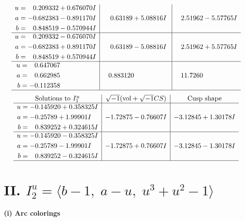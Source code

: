 \documentclass[1p]{elsarticle_modified}
\theoremstyle{definition}
\newcommand{\I}{\sqrt{-1}}
\begin{document}
$$\begin{array}{c|c|c}
\begin{aligned}
u &= \phantom{-}0.209332 + 0.676070 I \\
a &= -0.682383 - 0.891170 I \\
b &= \phantom{-}0.848519 - 0.570944 I\end{aligned}
 & \phantom{-}0.63189 + 5.08816 I & \phantom{-}2.51962 - 5.57765 I \\ \hline\begin{aligned}
u &= \phantom{-}0.209332 - 0.676070 I \\
a &= -0.682383 + 0.891170 I \\
b &= \phantom{-}0.848519 + 0.570944 I\end{aligned}
 & \phantom{-}0.63189 - 5.08816 I & \phantom{-}2.51962 + 5.57765 I \\ \hline\begin{aligned}
u &= \phantom{-}0.647067\phantom{ +0.000000I} \\
a &= \phantom{-}0.662985\phantom{ +0.000000I} \\
b &= -0.112358\phantom{ +0.000000I}\end{aligned}
 & \phantom{-}0.883120\phantom{ +0.000000I} & \phantom{-}11.7260\phantom{ +0.000000I}\\
 \hline 
 \end{array}$$\newpage$$\begin{array}{c|c|c}  
\text{Solutions to }I^u_{1}& \I (\text{vol} + \sqrt{-1}CS) & \text{Cusp shape}\\
 \hline 
\begin{aligned}
u &= -0.145920 + 0.358325 I \\
a &= -0.25789 + 1.99901 I \\
b &= \phantom{-}0.839252 + 0.324615 I\end{aligned}
 & -1.72875 - 0.76607 I & -3.12845 + 1.30178 I \\ \hline\begin{aligned}
u &= -0.145920 - 0.358325 I \\
a &= -0.25789 - 1.99901 I \\
b &= \phantom{-}0.839252 - 0.324615 I\end{aligned}
 & -1.72875 + 0.76607 I & -3.12845 - 1.30178 I\\
 \hline 
 \end{array}$$\newpage\newpage\renewcommand{\arraystretch}{1}
\centering \section*{II. $I^u_{2}= \langle b-1,\;a- u,\;u^3+u^2-1 \rangle$}
\flushleft \textbf{(i) Arc colorings}\\
\end{document}

